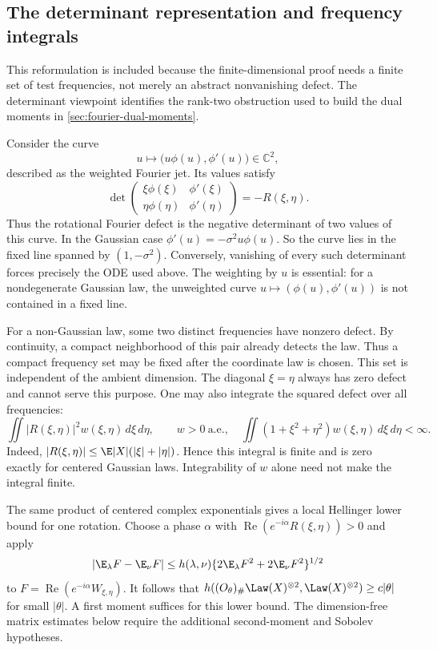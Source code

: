 \subsection{The determinant representation and frequency integrals}
\label{sec:fourier-determinant}

This reformulation is included because the finite-dimensional proof needs a
finite set of test frequencies, not merely an abstract nonvanishing defect.
The determinant viewpoint identifies the rank-two obstruction used to build
the dual moments in \cref{sec:fourier-dual-moments}.

Consider the curve
\[
 u\longmapsto\bigl(u\phi(u),\phi'(u)\bigr)\in\mathbb C^2,
\]
described as the weighted Fourier jet.  Its values satisfy
\begin{equation}
 \det\!\begin{pmatrix}
 \xi\phi(\xi)&\phi'(\xi)\\
 \eta\phi(\eta)&\phi'(\eta)
 \end{pmatrix}
 =-R(\xi,\eta).
 \label{eq:fourier-wedge}
\end{equation}
Thus the rotational Fourier defect is the negative determinant of two values
of this curve.
In the Gaussian case \(\phi'(u)=-\sigma^2u\phi(u)\).
So the curve lies in the fixed line spanned by \((1,-\sigma^2)\).
Conversely, vanishing of every such determinant forces precisely the ODE
used above.
The weighting by \(u\) is essential: for a nondegenerate Gaussian law, the
unweighted curve \(u\mapsto(\phi(u),\phi'(u))\) is not contained in a fixed
line.

For a non-Gaussian law, some two distinct frequencies have nonzero
defect.
By continuity, a compact neighborhood of this pair already detects the law.
Thus a compact frequency set may be fixed after the coordinate law is chosen.
This set is independent of the ambient dimension.
The diagonal \(\xi=\eta\) always has zero defect and cannot serve this
purpose.
One may also integrate the squared defect over all frequencies:
\begin{equation}
 \iint|R(\xi,\eta)|^2w(\xi,\eta)\,d\xi\,d\eta,
 \qquad
 w>0\ \text{a.e.},\quad
 \iint(1+\xi^2+\eta^2)w(\xi,\eta)\,d\xi\,d\eta<\infty.
 \label{eq:fourier-defect-energy}
\end{equation}
Indeed, \(|R(\xi,\eta)|\le\E|X|(|\xi|+|\eta|)\).
Hence this integral is finite and is zero exactly for centered Gaussian laws.
Integrability of $w$ alone need not make the integral finite.

The same product of centered complex exponentials gives a local Hellinger
lower bound for one rotation.
Choose a phase $\alpha$ with
$\operatorname{Re}(e^{-i\alpha}R(\xi,\eta))>0$ and apply
\[
 |\E_\lambda F-\E_\nu F|
 \le h(\lambda,\nu)
             \{2\E_\lambda F^2+2\E_\nu F^2\}^{1/2}
\]
to $F=\operatorname{Re}(e^{-i\alpha}W_{\xi,\eta})$.
It follows that
$h((O_\theta)_\#\Law(X)^{\otimes2},
\Law(X)^{\otimes2})\ge c|\theta|$ for small
$|\theta|$.
A first moment suffices for this lower bound.
The dimension-free matrix estimates below require the additional
second-moment and Sobolev hypotheses.

